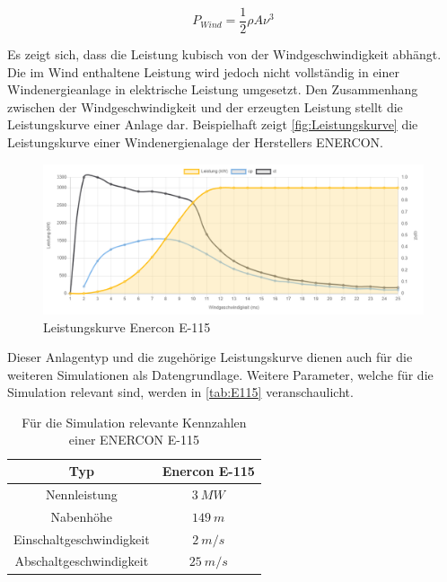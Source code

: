 \begin{equation}
	P_{Wind} = \frac{1}{2}\rho A \nu^3
\end{equation}

Es zeigt sich, dass die Leistung kubisch von der Windgeschwindigkeit abhängt. Die im Wind enthaltene Leistung wird jedoch nicht vollständig in einer Windenergieanlage in elektrische Leistung umgesetzt. Den Zusammenhang zwischen der Windgeschwindigkeit und der erzeugten Leistung stellt die Leistungskurve einer Anlage dar. Beispielhaft zeigt \autoref{fig:Leistungskurve} die Leistungskurve einer Windenergienalage der Herstellers ENERCON. 

\begin{figure}[H]
	\centering
	\includegraphics[width=0.9\linewidth]{Abbildungen/Enercon E115.png}
	\caption{Leistungskurve Enercon E-115 \cite{E115}}
	\label{fig:Leistungskurve}
\end{figure}

Dieser Anlagentyp und die zugehörige Leistungskurve dienen auch für die weiteren Simulationen als Datengrundlage. Weitere Parameter, welche für die Simulation relevant sind, werden in \autoref{tab:E115} veranschaulicht.

\begin{table}
	\begin{tabular}[htpb]{c|c}
		Typ & Enercon E-115 \\
		\hline
		Nennleistung & $3~MW$ \\
		Nabenhöhe & $149~m$ \\
		Einschaltgeschwindigkeit & $2~m/s$ \\
		Abschaltgeschwindigkeit & $25~m/s$
	\end{tabular}
	\centering
	\caption{Für die Simulation relevante Kennzahlen einer ENERCON E-115 \cite{E115}}
	\label{tab:E115}
\end{table}


